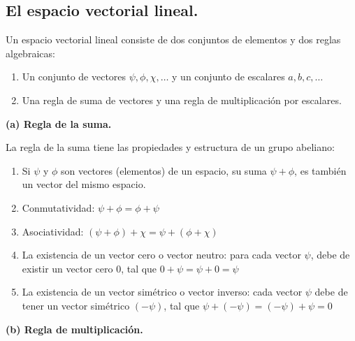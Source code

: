 \subsection{El espacio vectorial lineal.}
Un espacio vectorial lineal consiste de dos conjuntos de elementos y dos reglas algebraicas:
\begin{enumerate}
\item Un conjunto de vectores $\psi, \phi, \chi, \ldots$ y un conjunto de escalares $a, b, c, \ldots$
\item Una regla de suma de vectores y una regla de multiplicación por escalares.
\end{enumerate}
\textbf{(a) Regla de la suma.}

La regla de la suma tiene las propiedades y estructura de un grupo abeliano:
\begin{enumerate}
\item Si $\psi$ y $\phi$ son vectores (elementos) de un espacio, su suma $\psi + \phi$, es también un vector del mismo espacio.
\item Conmutatividad: $\psi + \phi = \phi + \psi$
\item Asociatividad: $(\psi + \phi) + \chi = \psi + (\phi + \chi)$
\item La existencia de un vector cero o vector neutro: para cada vector $\psi$, debe de existir un vector cero $0$, tal que $0 + \psi = \psi + 0 = \psi$
\item La existencia de un vector simétrico o vector inverso: cada vector $\psi$ debe de tener un vector simétrico $(-\psi)$, tal que $\psi + (-\psi) = (-\psi) + \psi = 0$
\end{enumerate}
\textbf{(b) Regla de multiplicación.}

